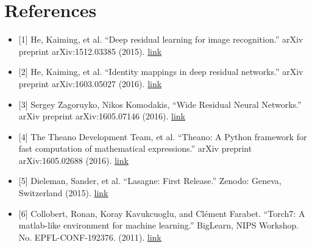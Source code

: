 \documentclass[10pt,a4paper,onecolumn]{article}
\newcommand{\tightlist}{%
  \setlength{\itemsep}{1pt}\setlength{\parskip}{0pt}\setlength{\parsep}{0pt}}
\begin{document}
\section{References}\label{references}

\begin{itemize}
\tightlist
\item
  {[}1{]} He, Kaiming, et al. ``Deep residual learning for image
  recognition.'' arXiv preprint arXiv:1512.03385 (2015).
  \href{https://arxiv.org/abs/1512.03385}{link}
\item
  {[}2{]} He, Kaiming, et al. ``Identity mappings in deep residual
  networks.'' arXiv preprint arXiv:1603.05027 (2016).
  \href{https://arxiv.org/abs/1603.05027}{link}
\item
  {[}3{]} Sergey Zagoruyko, Nikos Komodakis, ``Wide Residual Neural
  Networks.'' arXiv preprint arXiv:1605.07146 (2016).
  \href{https://arxiv.org/abs/1605.07146}{link}
\item
  {[}4{]} The Theano Development Team, et al. ``Theano: A Python
  framework for fast computation of mathematical expressions.'' arXiv
  preprint arXiv:1605.02688 (2016).
  \href{https://arxiv.org/abs/1605.02688}{link}
\item
  {[}5{]} Dieleman, Sander, et al. ``Lasagne: First Release.'' Zenodo:
  Geneva, Switzerland (2015).
  \href{http://lasagne.readthedocs.io/en/latest/index.html}{link}
\item
  {[}6{]} Collobert, Ronan, Koray Kavukcuoglu, and Clément Farabet.
  ``Torch7: A matlab-like environment for machine learning.'' BigLearn,
  NIPS Workshop. No. EPFL-CONF-192376. (2011).
  \href{http://cs.nyu.edu/~koray/files/2011_torch7_nipsw.pdf}{link}
\end{itemize}

{\sffamily \small
  \printbibliography
}
\end{document}
